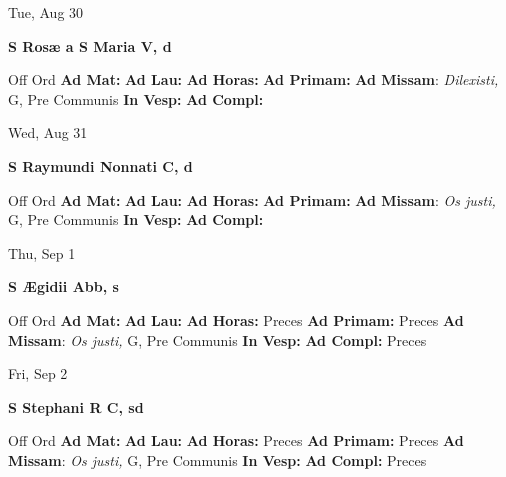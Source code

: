 \documentclass[10pt]{article}
\begin{document}
\begin{minipage}{3.5in}
\vspace{2em}\begin{center}
Tue, Aug 30
\end{center}\textbf{ \large S Rosæ a S Maria V, \textnormal{\normalsize d}}
\begin{justify}
Off Ord
\textbf{Ad Mat: }
\textbf{Ad Lau: }
\textbf{Ad Horas: }
\textbf{Ad Primam: }
\textbf{Ad Missam}: \textit{Dilexisti,} G, Pre Communis
\textbf{In Vesp: }
\textbf{Ad Compl: }\end{justify}
\end{minipage}



\begin{minipage}{3.5in}
\vspace{2em}\begin{center}
Wed, Aug 31
\end{center}\textbf{ \large S Raymundi Nonnati C, \textnormal{\normalsize d}}
\begin{justify}
Off Ord
\textbf{Ad Mat: }
\textbf{Ad Lau: }
\textbf{Ad Horas: }
\textbf{Ad Primam: }
\textbf{Ad Missam}: \textit{Os justi,} G, Pre Communis
\textbf{In Vesp: }
\textbf{Ad Compl: }\end{justify}
\end{minipage}



\begin{minipage}{3.5in}
\vspace{2em}\begin{center}
Thu, Sep 1
\end{center}\textbf{ \large S Ægidii Abb, \textnormal{\normalsize s}}
\begin{justify}
Off Ord
\textbf{Ad Mat: }
\textbf{Ad Lau: }
\textbf{Ad Horas: }Preces
\textbf{Ad Primam: }Preces
\textbf{Ad Missam}: \textit{Os justi,} G, Pre Communis
\textbf{In Vesp: }
\textbf{Ad Compl: }Preces\end{justify}
\end{minipage}



\begin{minipage}{3.5in}
\vspace{2em}\begin{center}
Fri, Sep 2
\end{center}\textbf{ \large S Stephani R C, \textnormal{\normalsize sd}}
\begin{justify}
Off Ord
\textbf{Ad Mat: }
\textbf{Ad Lau: }
\textbf{Ad Horas: }Preces
\textbf{Ad Primam: }Preces
\textbf{Ad Missam}: \textit{Os justi,} G, Pre Communis
\textbf{In Vesp: }
\textbf{Ad Compl: }Preces\end{justify}
\end{minipage}
\end{document}
